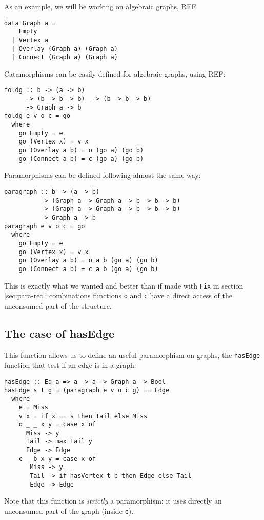 \documentclass[format=sigplan]{acmart}
\newcommand{\minline}[1]{\texttt{#1}}
\begin{document}
As an example, we will be working on algebraic graphs, REF
\begin{verbatim}
data Graph a =
    Empty
  | Vertex a
  | Overlay (Graph a) (Graph a)
  | Connect (Graph a) (Graph a)
\end{verbatim}

Catamorphisms can be easily defined for algebraic graphs, using REF:
\begin{verbatim}
foldg :: b -> (a -> b)
      -> (b -> b -> b)  -> (b -> b -> b) 
      -> Graph a -> b
foldg e v o c = go
  where
    go Empty = e
    go (Vertex x) = v x
    go (Overlay a b) = o (go a) (go b)
    go (Connect a b) = c (go a) (go b)
\end{verbatim}

Paramorphisms can be defined following almost the same way:
\begin{verbatim}
paragraph :: b -> (a -> b) 
          -> (Graph a -> Graph a -> b -> b -> b) 
          -> (Graph a -> Graph a -> b -> b -> b) 
          -> Graph a -> b
paragraph e v o c = go
  where
    go Empty = e
    go (Vertex x) = v x
    go (Overlay a b) = o a b (go a) (go b)
    go (Connect a b) = c a b (go a) (go b)
\end{verbatim}

This is exactly what we wanted and better than if made with \minline{Fix} in section \ref{sec:para-rec}: combinations functions \minline{o} and \minline{c} have a direct access of the unconsumed part of the structure.

\subsection{The case of hasEdge}

This function allows us to define an useful paramorphism on graphs, the \minline{hasEdge} function that test if an edge is in a graph:

\begin{verbatim}
hasEdge :: Eq a => a -> a -> Graph a -> Bool
hasEdge s t g = (paragraph e v o c g) == Edge
  where
    e = Miss
    v x = if x == s then Tail else Miss
    o _ _ x y = case x of
      Miss -> y
      Tail -> max Tail y
      Edge -> Edge
    c _ b x y = case x of
       Miss -> y
       Tail -> if hasVertex t b then Edge else Tail
       Edge -> Edge
\end{verbatim}

Note that this function is \emph{strictly} a paramorphism: it uses directly an unconsumed part of the graph (inside \minline{c}).
\end{document}
